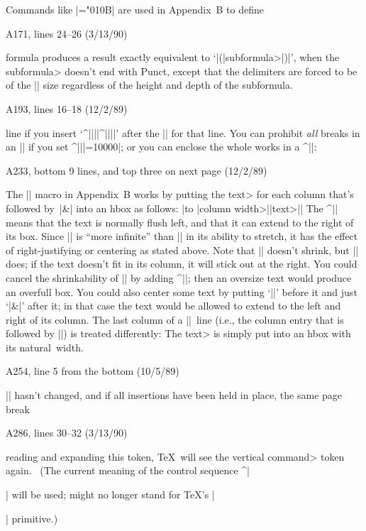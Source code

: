 \ninepoint
Commands like |\mathchardef\alpha="010B| are used in
Appendix~B to define\cutpar

\bugonpage A171, lines 24--26 (3/13/90)

\ninepoint\noindent
formula produces a result exactly equivalent to
`|\left(|\<subformula>|\right)|', when the \<subformula> doesn't end
with Punct, except that the {delimiters} are forced to
be of the |\big| size regardless of the height and depth of the subformula.

\bugonpage A193, lines 16--18 (12/2/89)

\ninepoint\noindent
line if you insert
`^|\noalign||{|^|\break||}|'
after the |\cr| for that line. You can prohibit {\sl all\/} breaks
in an |\eqalignno| if you set ^|\interdisplaylinepenalty||=10000|; or you
can enclose the whole works in a ^|\vbox|:

\bugonpage A233, bottom 9 lines, and top three on next page (12/2/89)

\danger The |\+| macro in Appendix~B works
by putting the \<text> for each column that's followed by~|&|
into an hbox as follows:
\begindisplay
|\hbox to |\<column width>|{|\<text>|\hss}|
\enddisplay
The ^|\hss| means that the text is normally flush left, and that it can
extend to the right of its box. Since |\hfill| is ``more infinite'' than
|\hss| in its ability to stretch, it has the effect of right-justifying or
centering as stated above. Note that |\hfill| doesn't shrink, but |\hss|
does; if the text doesn't fit in its column, it will stick out at the right.
You could cancel the shrinkability of |\hss| by adding ^|\hfilneg|; then
an oversize text would produce an overfull box.
You could also center some text by putting `|\hss|' before it and just
`|&|' after it; in that case the text would be allowed to extend to the
left and right of its column.
 The last column of a |\+|~line (i.e., the column entry that is
followed by |\cr|) is treated differently: The
\<text> is simply put into an hbox with its natural~width.

\bugonpage A254, line 5 from the bottom (10/5/89)

\ninepoint\noindent
|\vsize| hasn't changed, and if all insertions have been
held in place, the same page break\cutpar

\bugonpage A286, lines 30--32 (3/13/90)

\ninepoint\noindent
reading and expanding this 
token, \TeX\ will see the \<vertical command> token again. \ (The current
meaning of the control sequence ^|\par| will be used;  might no
longer stand for \TeX's |\par| primitive.)


